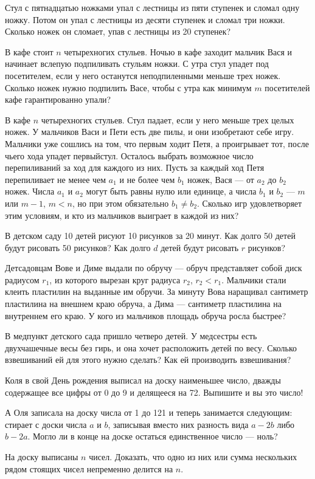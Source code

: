 ﻿%
\begin{itemize}
\itA Стул с пятнадцатью ножками упал с лестницы из пяти ступенек и сломал одну ножку. Потом он упал с лестницы из десяти ступенек и сломал три ножки. Сколько ножек он сломает, упав с лестницы из 20 ступенек?

\itB В кафе стоит $n$ четырехногих стульев. Ночью в кафе заходит мальчик Вася и начинает вслепую подпиливать стульям ножки. С утра стул упадет под посетителем, если у него останутся неподпиленными меньше трех ножек. Сколько ножек нужно подпилить Васе, чтобы с утра как минимум $m$ посетителей кафе гарантированно упали?

\itC В кафе $n$ четырехногих стульев. Стул падает, если у него меньше трех целых ножек. У мальчиков Васи и Пети есть две пилы, и они изобретают себе игру. Мальчики уже сошлись на том, что первым ходит Петя, а проигрывает тот, после чьего хода упадет первый\linebreak стул. Осталось выбрать возможное число перепиливаний за ход для каждого из них. Пусть за каждый ход Петя перепиливает не менее чем $a_1$ и не более чем $b_1$ ножек, Вася — от $a_2$ до $b_2$ ножек. Числа $a_1$ и $a_2$ могут быть равны нулю или единице, а числа $b_1$ и $b_2$ — $m$ или $m-1$, $m<n$, но при этом обязательно $b_1 \ne b_2$. Сколько игр удовлетворяет этим условиям, и кто из мальчиков выиграет в каждой из них?
\end{itemize}

\begin{itemize}
\itA В детском саду 10 детей рисуют 10 рисунков за 20 минут. Как долго 50 детей будут рисовать 50 рисунков? Как долго $d$ детей будут рисовать $r$ рисунков?

\itB Детсадовцам Вове и Диме выдали по обручу — обруч представляет собой диск радиусом $r_1$, из которого вырезан круг радиуса $r_2$, $r_2<r_1$. Мальчики стали клеить пластилин на выданные им обручи. За минуту Вова наращивал сантиметр пластилина на внешнем краю обруча, а Дима — сантиметр пластилина на внутреннем его краю. У кого из мальчиков площадь обруча росла быстрее?

\itC В медпункт детского сада пришло четверо детей. У медсестры есть двухчашечные весы без гирь, и она хочет расположить детей по весу. Сколько взвешиваний ей для этого нужно сделать? Как ей производить взвешивания?
\end{itemize}

\begin{itemize}
\itA Коля в свой День рождения выписал на доску наименьшее число, дважды содержащее все цифры от 0 до 9 и делящееся на 72. Выпишите и вы это число!

\itB А Оля записала на доску числа от 1 до 121 и теперь занимается следующим: стирает с доски числа $a$ и $b$, записывая вместо них разность вида $a-2b$ либо $b-2a$. Могло ли в конце на доске остаться единственное число — ноль?

\itC На доску выписаны $n$ чисел. Доказать, что одно из них или сумма нескольких рядом стоящих чисел непременно делится на $n$.
\end{itemize}

